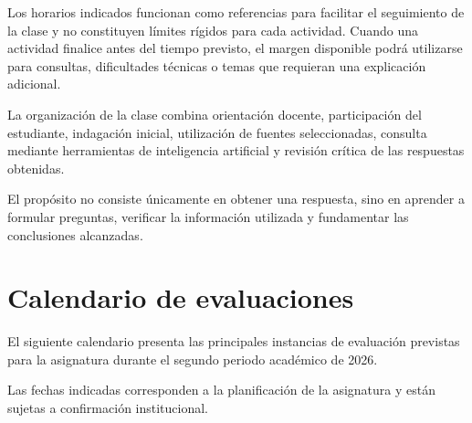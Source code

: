 \documentclass[10pt]{article}
\begin{document}
Los horarios indicados funcionan como referencias para facilitar el
seguimiento de la clase y no constituyen límites rígidos para cada
actividad. Cuando una actividad finalice antes del tiempo previsto,
el margen disponible podrá utilizarse para consultas, dificultades
técnicas o temas que requieran una explicación adicional.

La organización de la clase combina orientación docente, participación
del estudiante, indagación inicial, utilización de fuentes seleccionadas,
consulta mediante herramientas de inteligencia artificial y revisión
crítica de las respuestas obtenidas.

El propósito no consiste únicamente en obtener una respuesta, sino en
aprender a formular preguntas, verificar la información utilizada y
fundamentar las conclusiones alcanzadas.


\section{Calendario de evaluaciones}

El siguiente calendario presenta las principales instancias de evaluación
previstas para la asignatura durante el segundo periodo académico de 2026.

Las fechas indicadas corresponden a la planificación de la asignatura y
están sujetas a confirmación institucional.\parencite{armoa2026planeamiento,ua2026calendarioAcademico}
\end{document}
